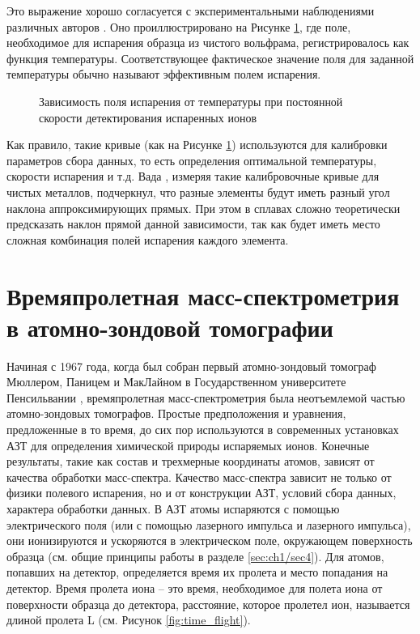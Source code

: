 Это выражение хорошо согласуется с экспериментальными наблюдениями различных авторов \cite{Kellogg84,Kellogg81,Wada84,Kellogg80,Vurpillot06}. Оно проиллюстрировано на Рисунке  \cref{fig:field_temp}, где поле, необходимое для испарения образца из чистого вольфрама, регистрировалось как функция температуры. Соответствующее фактическое значение поля для заданной температуры обычно называют эффективным полем испарения.

\begin{figure}[tb]
	\caption{Зависимость поля испарения от температуры при постоянной скорости детектирования испаренных ионов \cite{Vurpillot06}}
	\label{fig:field_temp}
\end{figure} 

\FloatBarrier


Как правило, такие кривые (как на Рисунке \cref{fig:field_temp}) используются для калибровки параметров сбора данных, то есть определения оптимальной температуры, скорости испарения и т.д. Вада \cite{Wada84}, измеряя такие калибровочные кривые для чистых металлов, подчеркнул, что разные элементы будут иметь разный угол наклона аппроксимирующих прямых. При этом в сплавах сложно теоретически предсказать наклон прямой данной зависимости, так как будет иметь место сложная комбинация полей испарения каждого элемента.

\FloatBarrier

\section{Времяпролетная масс-спектрометрия в атомно-зондовой томографии}\label{sec:ch1/sec2}

Начиная с  1967 года, когда был собран первый атомно-зондовый томограф Мюллером, Паницем и МакЛайном в Государственном университете Пенсильвании \cite{Muller68},  времяпролетная масс-спектрометрия была неотъемлемой частью атомно-зондовых томографов. Простые предположения и уравнения, предложенные в то время, до сих пор  используются в современных установках АЗТ для определения химической природы испаряемых ионов. Конечные результаты, такие как состав и трехмерные координаты атомов, зависят от качества обработки масс-спектра.
Качество масс-спектра зависит не только от физики полевого испарения, но и от конструкции АЗТ, условий сбора данных, характера обработки данных. В АЗТ атомы испаряются с помощью электрического поля (или с помощью лазерного импульса и лазерного импульса), они ионизируются и ускоряются в электрическом поле, окружающем поверхность образца (см. общие принципы работы в разделе \cref{sec:ch1/sec4}). Для атомов, попавших на детектор, определяется время их пролета и место попадания на детектор. Время пролета иона – это время, необходимое для полета иона от поверхности образца до детектора, расстояние, которое пролетел ион, называется длиной пролета L (см. Рисунок \cref{fig:time_flight}). 

